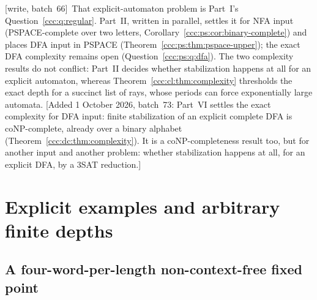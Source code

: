 \documentclass[11pt,letterpaper]{article}
\theoremstyle{definition}
\theoremstyle{remark}
\newcommand{\wsix}{\textup{[write, batch~66]}}
\newcommand{\waddsevthree}[1]{\textup{[}Added 1 October 2026, batch~73: #1\textup{]}}
\begin{document}
\wsix\ That explicit-automaton problem is Part~I's
Question~\ref{ccc:q:regular}. Part~II, written in parallel, settles it for
NFA input (PSPACE-complete over two letters,
Corollary~\ref{ccc:ps:cor:binary-complete}) and places DFA input in PSPACE
(Theorem~\ref{ccc:ps:thm:pspace-upper}); the exact DFA complexity remains
open (Question~\ref{ccc:ps:q:dfa}). The two complexity results do not
conflict: Part~II decides whether stabilization happens at all for an
explicit automaton, whereas Theorem~\ref{ccc:cl:thm:complexity} thresholds the
exact depth for a succinct list of rays, whose periods can force
exponentially large automata.
\waddsevthree{Part~VI settles the exact complexity for DFA input: finite stabilization of an explicit complete DFA is coNP-complete, already over a binary alphabet (Theorem~\ref{ccc:dc:thm:complexity}). It is a coNP-completeness result too, but for
another input and another problem: whether stabilization happens at all, for
an explicit DFA, by a 3SAT reduction.}

\section{Explicit examples and arbitrary finite depths}\label{ccc:cl:sec:examples}

\subsection{A four-word-per-length non-context-free fixed point}
\end{document}
